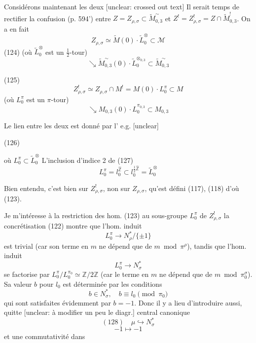 \begin{enumerate}
Considérons maintenant les deux
[unclear: crossed out text]
Il serait temps
de rectifier la
confusion (p. 594') entre $Z = Z_{\rho,\sigma} \subset \tilde{M}_{0,3}^\sim$
et $Z^! = Z^!_{\rho,\sigma} = Z \cap \tilde{M}_{0,3}^!$. On a en fait
$$ Z_{\rho,\sigma} \simeq \tilde{M}(0) \cdot \tilde{L}_0^\otimes \subset \mathcal{M} $$
(124) \hfill (où $\tilde{L}_0^\otimes$ est un $\frac{1}{2}$-tour)
$$ \searrow \tilde{M}_{0,3}^\sim(0) \cdot \tilde{L}_0^{\otimes_{0,3}} \subset \tilde{M}_{0,3}^\sim $$

(125) $$ Z^!_{\rho,\sigma} \simeq Z_{\rho,\sigma} \cap M^! = M(0) \cdot L_0^\pi \subset M $$
\hfill (où $L_0^\pi$ est un $\pi$-tour)
$$ \searrow M_{0,3}(0) \cdot L_0^{\pi_{0,3}} \subset M_{0,3} $$

Le lien entre les deux est donné
par l' e.g. [unclear]

(126)

où $L_0^\pi \subset \tilde{L}_0^\otimes$
L'inclusion d'indice 2 de
(127) $$ L_0^\pi = l_0^{\hat{\mathbb{Z}}} \subset l_0^{\frac{1}{2}\hat{\mathbb{Z}}} = \tilde{L}_0^\otimes $$

Bien entendu, c'est bien sur $Z^!_{\rho,\sigma}$, non sur
$Z_{\rho,\sigma}$, qu'est défini (117), (118) d'où (123).

\newpage


Je m'intéresse à la restriction des
hom. (123) au sous-groupe $L_0^\pi$ de $Z_{\rho,\sigma}^!$
la concrétisation (122) montre que
l'hom. induit
$$L_0^\pi \longrightarrow N_\rho^*/\{\pm 1\}$$
est trivial (car son terme en $m$ ne
dépend que de $m \bmod \pi^\rho$), tandis que l'hom.
induit
$$L_0^\pi \longrightarrow N_\sigma^*$$
se factorise par $L_0^\pi/L_0^{\pi_0} \simeq \mathbb{Z}/2\mathbb{Z}$ (car
le terme en $m$ ne dépend que de
$m \bmod \pi_0^\sigma$). Sa valeur $b$ pour $l_0$ est
déterminée par les conditions
$$b \in N_\sigma^*, \quad b \equiv l_0 \pmod{\pi_0}$$
qui sont satisfaites évidemment par $b=-1$. Donc
il y a lieu d'introduire aussi, quitte
[unclear: à modifier un peu le diagr.] central
canonique
$$(128) \quad \mu \hookrightarrow N_\sigma^*$$
$$-1 \longmapsto -1$$
et une commutativité dans


\end{enumerate}
